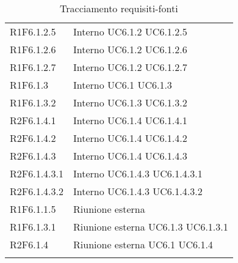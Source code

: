 \begin{longtable}{p{2.5cm}!{\VRule[1pt]}p{2.5cm}}
 \\
R1F6.1.2.5 & Interno \newline UC6.1.2
 \newline UC6.1.2.5
 \\
R1F6.1.2.6 & Interno \newline UC6.1.2
 \newline UC6.1.2.6
 \\
R1F6.1.2.7 & Interno \newline UC6.1.2
 \newline UC6.1.2.7
 \\
R1F6.1.3 & Interno \newline UC6.1
 \newline UC6.1.3
 \\
R1F6.1.3.2 & Interno \newline UC6.1.3
 \newline UC6.1.3.2
 \\
R2F6.1.4.1 & Interno \newline UC6.1.4
 \newline UC6.1.4.1
 \\
R2F6.1.4.2 & Interno \newline UC6.1.4
 \newline UC6.1.4.2
 \\
R2F6.1.4.3 & Interno \newline UC6.1.4
 \newline UC6.1.4.3
 \\
R2F6.1.4.3.1 & Interno \newline UC6.1.4.3
 \newline UC6.1.4.3.1
 \\
R2F6.1.4.3.2 & Interno \newline UC6.1.4.3
 \newline UC6.1.4.3.2
 \\
R1F6.1.1.5 & Riunione esterna \\
R1F6.1.3.1 & Riunione esterna \newline UC6.1.3
 \newline UC6.1.3.1
 \\
R2F6.1.4 & Riunione esterna \newline UC6.1
 \newline UC6.1.4
 \\
\caption{Tracciamento requisiti-fonti}
\end{longtable}
